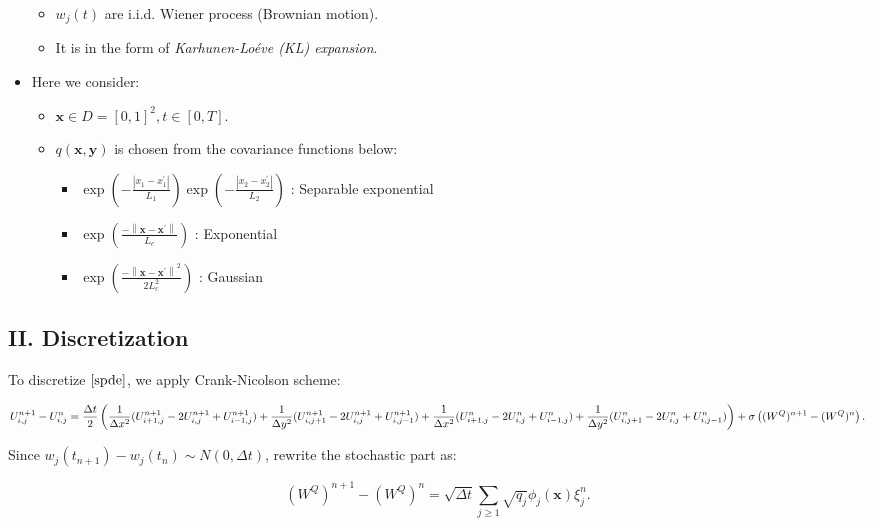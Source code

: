 \documentclass[
]{article}
\begin{document}
\begin{itemize}
  \begin{itemize}
  \item
    \( w_j(t)\) are i.i.d. Wiener process (Brownian motion). 
  \item
    It is in the form of \emph{Karhunen-Loéve (KL) expansion}.
  \end{itemize}
\item
  Here we consider:

  \begin{itemize}
  \item
    \(\mathbf{x}\in D=[0,1]^2, t\in[0,T]\). 
  \item
    \(q(\mathbf{x},\mathbf{y})\) is chosen from the covariance functions
    below:

    \begin{itemize}
    \item
      \(\exp\left(-\frac{|x_1-x^{\prime}_1|}{L_1}\right) \exp\left(-\frac{|x_2-x^{\prime}_2|}{L_2}\right)\)
      : Separable exponential
    \item
      \(\exp \left(\frac{-\left\|\mathbf{x}-\mathbf{x}^{\prime}\right\|}{L_{c}}\right)\)
      : Exponential
    \item
      \(\exp \left(\frac{-\left\|\mathbf{x}-\mathbf{x}^{\prime}\right\|^{2}}{2 L_{c}^{2}}\right)\)
      : Gaussian
    \end{itemize}
  \end{itemize}
\end{itemize}

\hypertarget{header-n63}{%
\subsection{II. Discretization}\label{header-n63}}

To discretize \(\eqref{spde}\), we apply Crank-Nicolson scheme:

\[U^{n+1}_{i,j}-U^n_{i,j}=\frac{\Delta t}{2}\left(\frac{1}{\Delta x^2}(U^{n+1}_{i+1,j}-2U^{n+1}_{i,j}+U^{n+1}_{i-1,j})\\+\frac{1}{\Delta y^2}(U^{n+1}_{i,j+1}-2U^{n+1}_{i,j}+U^{n+1}_{i,j-1})+
\frac{1}{\Delta x^2}(U^{n}_{i+1,j}-2U^{n}_{i,j}+U^{n}_{i-1,j})+\\\frac{1}{\Delta y^2}(U^{n}_{i,j+1}-2U^{n}_{i,j}+U^{n}_{i,j-1})\right)+\sigma \left((W^Q)^{n+1}-(W^Q)^{n}\right).\]

Since \(w_j(t_{n+1})-w_j(t_n)\sim N(0, \Delta t)\), rewrite the
stochastic part as:

\[(W^Q)^{n+1}-(W^Q)^{n}=\sqrt{\Delta t}\sum_{j\ge1}\sqrt{q_j}\phi_j(\mathbf{x})\xi^n_{j}.\]
\end{document}
